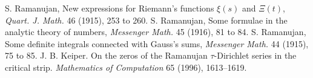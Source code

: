  S. Ramanujan, New expressions for Riemann's functions $\xi(s)$ and $\Xi(t)$, \emph{Quart. J. Math.} 46 (1915), 253 to 260.
 S. Ramanujan, Some formulae in the analytic theory of numbers, \emph{Messenger Math.} 45 (1916), 81 to 84.
 S. Ramanujan, Some definite integrals connected with Gauss's sums, \emph{Messenger Math.} 44 (1915), 75 to 85.
 J. B. Keiper. On the zeros of the Ramanujan $\tau$-Dirichlet series in the critical strip. \emph{Mathematics of Computation} 65 (1996), 1613--1619.
